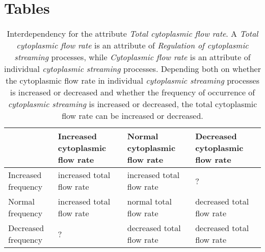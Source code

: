 \documentclass[11pt]{article}
\begin{document}
\section*{Tables}
\begin{table*}[h]
  \centering
  \begin{tabular}{p{2.5cm}|p{3cm}|p{3cm}|p{3cm}}
    & Increased cytoplasmic flow rate & Normal cytoplasmic flow rate &
    Decreased cytoplasmic flow rate \\
    \hline
    Increased frequency &increased total flow rate &increased total
    flow rate &?\\
    Normal frequency &increased total flow rate &normal total flow
    rate &decreased total flow rate\\
    Decreased frequency &?&decreased total flow rate &decreased total
    flow rate\\
    \hline
  \end{tabular}
  \caption{\label{tbl:flow}Interdependency for the attribute {\em
      Total cytoplasmic flow rate}. A {\em Total cytoplasmic flow
      rate} is an attribute of {\em Regulation of cytoplasmic
      streaming} processes, while {\em Cytoplasmic flow rate} is an
    attribute of individual {\em cytoplasmic streaming}
    processes. Depending both on whether the cytoplasmic flow rate in
    individual {\em cytoplasmic streaming} processes is increased or
    decreased and whether the frequency of occurrence of {\em
      cytoplasmic streaming} is increased or decreased, the total
    cytoplasmic flow rate can be increased or decreased.}
\end{table*}
\end{document}
